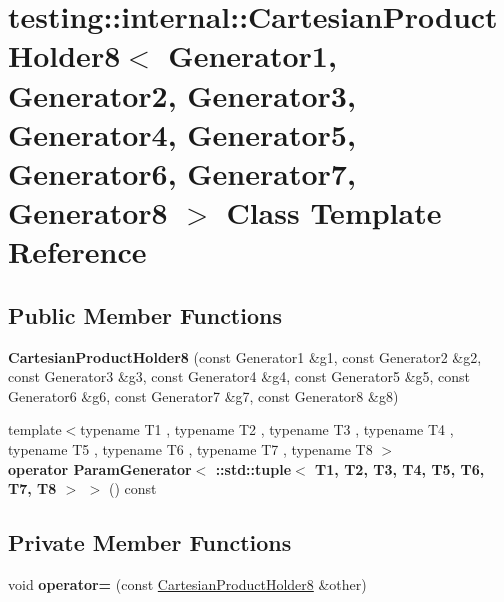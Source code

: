 \hypertarget{classtesting_1_1internal_1_1_cartesian_product_holder8}{}\section{testing\+:\+:internal\+:\+:Cartesian\+Product\+Holder8$<$ Generator1, Generator2, Generator3, Generator4, Generator5, Generator6, Generator7, Generator8 $>$ Class Template Reference}
\label{classtesting_1_1internal_1_1_cartesian_product_holder8}
\subsection*{Public Member Functions}
\begin{DoxyCompactItemize}
\item 
\mbox{\label{classtesting_1_1internal_1_1_cartesian_product_holder8_adacdd7a2e15963d1b2f559d65f6b2aac}} 
{\bfseries Cartesian\+Product\+Holder8} (const Generator1 \&g1, const Generator2 \&g2, const Generator3 \&g3, const Generator4 \&g4, const Generator5 \&g5, const Generator6 \&g6, const Generator7 \&g7, const Generator8 \&g8)
\item 
\mbox{\label{classtesting_1_1internal_1_1_cartesian_product_holder8_a19baa0d0ec826f2e10ffaafffcfdee3f}} 
{\footnotesize template$<$typename T1 , typename T2 , typename T3 , typename T4 , typename T5 , typename T6 , typename T7 , typename T8 $>$ }\\{\bfseries operator Param\+Generator$<$ \+::std\+::tuple$<$ T1, T2, T3, T4, T5, T6, T7, T8 $>$ $>$} () const
\end{DoxyCompactItemize}
\subsection*{Private Member Functions}
\begin{DoxyCompactItemize}
\item 
\mbox{\label{classtesting_1_1internal_1_1_cartesian_product_holder8_a8606e186a397706d0077ec9ead085477}} 
void {\bfseries operator=} (const \mbox{\hyperlink{classtesting_1_1internal_1_1_cartesian_product_holder8}{Cartesian\+Product\+Holder8}} \&other)
\end{DoxyCompactItemize}
